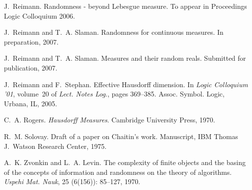 \documentclass[11pt,reqno]{article}
\theoremstyle{plain}
\theoremstyle{definition}
\theoremstyle{remark}
\numberwithin{equation}{section}
\begin{document}
\begin{thebibliography}{41}
J.~Reimann.
\newblock Randomness - beyond {L}ebesgue measure.
\newblock To appear in {P}roceedings {L}ogic {C}olloquium 2006.

J.~Reimann and T.~A. Slaman.
\newblock Randomness for continuous measures.
\newblock In preparation, 2007{}.

J.~Reimann and T.~A. Slaman.
\newblock Measures and their random reals.
\newblock Submitted for publication, 2007{}.

J.~Reimann and F.~Stephan.
\newblock Effective {H}ausdorff dimension.
\newblock In \emph{Logic Colloquium '01}, volume~20 of \emph{Lect. Notes Log.},
  pages 369--385. Assoc. Symbol. Logic, Urbana, IL, 2005.

C.~A. Rogers.
\newblock \emph{Hausdorff {M}easures}.
\newblock Cambridge University Press, 1970.

R.~M. Solovay.
\newblock Draft of a paper on Chaitin's work.
\newblock Manuscript, IBM Thomas J.\ Watson Research Center, 1975.

A.~K. Zvonkin and L.~A. Levin.
\newblock The complexity of finite objects and the basing of the concepts of
  information and randomness on the theory of algorithms.
\newblock \emph{Uspehi Mat. Nauk}, 25 (6(156)): 85--127,
  1970.

\end{thebibliography}
\end{document}
